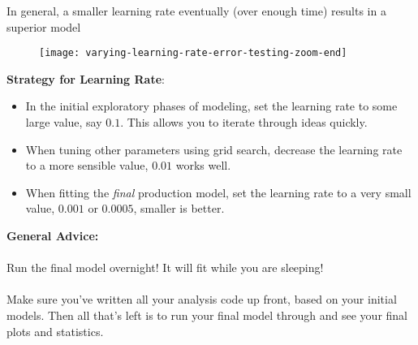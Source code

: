 %
\begin{frame}
In general, a smaller learning rate eventually (over enough time) results in a superior model

  \begin{figure}
    \texttt{[image: varying-learning-rate-error-testing-zoom-end]}
  \end{figure}
  
\end{frame}
%
\begin{frame}
\textbf{Strategy for Learning Rate}:

\begin{itemize}
  \item In the initial exploratory phases of modeling, set the learning rate to some large value, say $0.1$.  This allows you to iterate through ideas quickly.
  \item When tuning other parameters using grid search, decrease the learning rate to a more sensible value, $0.01$ works well.
  \item When fitting the \textit{final} production model, set the learning rate to a very small value, $0.001$ or $0.0005$, smaller is better.
\end{itemize}

\end{frame}
%
\begin{frame}
\textbf{General Advice:}\\~\\

Run the final model overnight!  It will fit while you are sleeping!\\~\\

Make sure you've written all your analysis code up front, based on your initial models.  Then all that's left is to run your final model through and see your final plots and statistics.
\end{frame}

